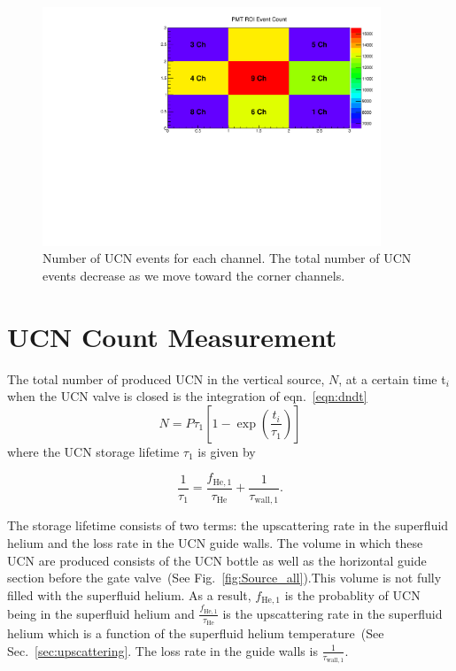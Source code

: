 \begin{figure}[h!]
  \centering
  \includegraphics[width=0.9\textwidth]{channelcounts.pdf}
  \caption{Number of UCN events for each channel. The total number of
    UCN events decrease as we move toward the corner channels.  }
  \label{fig:channelcounts}
\end{figure}


\section{UCN Count Measurement \label{UCNCounts}}

The total number of produced UCN in the vertical source, $N$, at a
certain time t$_i$ when the UCN valve is closed is the integration of
eqn.~\ref{eqn:dndt}
\begin{equation}
  \label{eq:totalUCN}
  N = P \tau_1\left[ 1- \exp \left(\frac{t_i }{ \tau_1}\right) \right]
\end{equation}
where the UCN storage lifetime $\tau_1$ is given by

\begin{equation}
  \label{eqn:tau1}
  \frac{1}{\tau_1} = \frac{ f_\mathrm{He,1}}{\tau_\mathrm{He}} + \frac{1}{\tau_\mathrm{wall,1}}.
\end{equation}

The storage lifetime consists of two terms: the upscattering rate in
the superfluid helium and the loss rate in the UCN guide walls. The
volume in which these UCN are produced consists of the UCN bottle as
well as the horizontal guide section before the gate valve~(See
Fig.~\ref{fig:Source_all}).This volume is not fully filled with the
superfluid helium. As a result, $ f_\mathrm{He,1}$ is the probablity
of UCN being in the superfluid helium and \large
$\frac{ f_\mathrm{He,1}}{\tau_\mathrm{He}}$ \normalsize is the
upscattering rate in the superfluid helium which is a function of the
superfluid helium temperature~(See Sec.~\ref{sec:upscattering}. The
loss rate in the guide walls is $\frac{1}{\tau_\mathrm{wall,1}}$.

